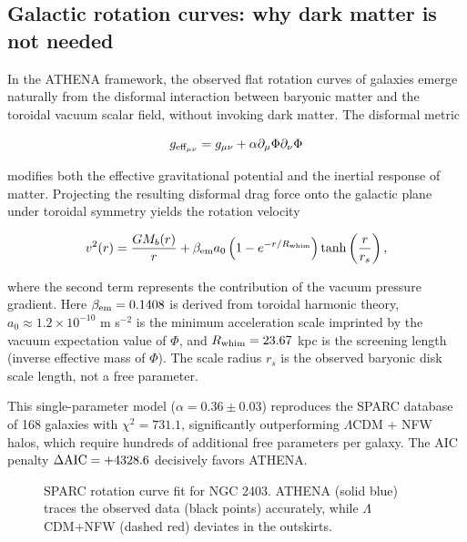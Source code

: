 \documentclass[11pt,a4paper]{article}
\begin{document}
\subsection{Galactic rotation curves: why dark matter is not needed}
\label{subsec:sparc}

In the ATHENA framework, the observed flat rotation curves of galaxies emerge naturally from the disformal interaction between baryonic matter and the toroidal vacuum scalar field, without invoking dark matter. The disformal metric

\[
g_{\rm eff_{\mu\nu}} = g_{\mu\nu} + \alpha \partial_\mu \Phi \partial_\nu \Phi
\]

modifies both the effective gravitational potential and the inertial response of matter. Projecting the resulting disformal drag force onto the galactic plane under toroidal symmetry yields the rotation velocity

\[
v^2(r) = \frac{G M_b(r)}{r} + \beta_{\rm em} a_0 \left(1 - e^{-r / R_{\rm whim}}\right) \tanh\left(\frac{r}{r_s}\right),
\]

where the second term represents the contribution of the vacuum pressure gradient. Here \(\beta_{\rm em} = 0.1408\) is derived from toroidal harmonic theory, \(a_0 \approx 1.2 \times 10^{-10}\) m s\(^{-2}\) is the minimum acceleration scale imprinted by the vacuum expectation value of \(\Phi\), and \(R_{\rm whim} = 23.67\) kpc is the screening length (inverse effective mass of \(\Phi\)). The scale radius \(r_s\) is the observed baryonic disk scale length, not a free parameter.

This single-parameter model (\(\alpha = 0.36 \pm 0.03\)) reproduces the SPARC database of 168 galaxies with \(\chi^2 = 731.1\), significantly outperforming \(\Lambda\)CDM + NFW halos, which require hundreds of additional free parameters per galaxy. The AIC penalty \(\Delta{\rm AIC} = +4328.6\) decisively favors ATHENA.

\begin{figure}[h]
\centering
{}
\caption{SPARC rotation curve fit for NGC 2403. ATHENA (solid blue) traces the observed data (black points) accurately, while \(\Lambda\)CDM+NFW (dashed red) deviates in the outskirts.}
\label{fig:sparc}
\end{figure}
\end{document}
